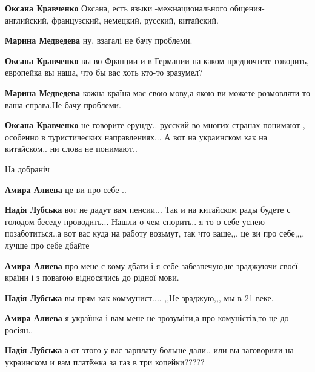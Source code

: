 \begin{itemize}
\begin{itemize}
\textbf{Оксана Кравченко} Оксана, есть языки -межнационального общения- английский, французский, немецкий, русский, китайский.

\textbf{Марина Медведева} ну, взагалі не бачу проблеми.

\textbf{Оксана Кравченко} вы во Франции и в Германии на каком предпочтете говорить, европейка вы наша, что бы вас хоть кто-то зразумел?

\textbf{Марина Медведева} кожна країна має свою мову,а якою ви можете розмовляти то ваша справа.Не бачу проблеми.

\textbf{Оксана Кравченко} не говорите ерунду.. русский во многих странах понимают , особенно в туристических направлениях... А вот на украинском как на китайском.. ни слова не понимают..

На добраніч

\textbf{Амира Алиева} це ви про себе ..

\textbf{Надія Лубська} вот не дадут вам пенсии... Так и на китайском рады будете с голодом беседу проводить... Нашли о чем спорить.. я то о себе успею позаботиться..а вот вас куда на работу возьмут, так что ваше,,, це ви про себе,,,, лучше про себе дбайте

\textbf{Амира Алиева} про мене є кому дбати і я себе забезпечую,не зраджуючи своєї країни і з повагою відносячись до рідної мови.

\textbf{Надія Лубська} вы прям как коммунист.... ,,Не зраджую,,, мы в 21 веке.

\textbf{Амира Алиева} я українка і вам мене не зрозуміти,а про комуністів,то це до росіян..

\textbf{Надія Лубська} а от этого у вас зарплату больше дали.. или вы
заговорили на украинском и вам платёжка за газ в три копейки?????


\end{itemize}


\end{itemize}

